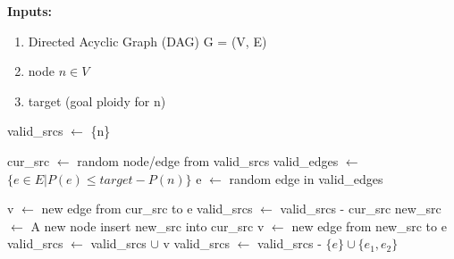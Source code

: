 \documentclass{article}
\begin{document}
\begin{algorithm}[H]
\caption{Reattach}\label{euclid}

\textbf{Inputs:} 
\begin{enumerate}
    \item Directed Acyclic Graph (DAG) G = (V, E)
    \item node $n \in V$
    \item target (goal ploidy for n)
\end{enumerate}

  \begin{algorithmic}[1]

    \State valid\_srcs $\gets$ \{n\}
    
        \State cur\_src $\gets$ random node/edge from valid\_srcs
        \State valid\_edges $\gets$ \( \{e \in E | P(e) \leq target - P(n)\}\)
        \State e $\gets$ random edge in valid\_edges
        
         
            \State v $\gets$ new edge from cur\_src to e
            \State valid\_srcs $\gets$ valid\_srcs - {cur\_src}
        \EndIf
         
            \State new\_src $\gets$ A new node 
            \State insert new\_src into cur\_src
            \State v $\gets$ new edge from new\_src to e
        \EndIf
        \State valid\_srcs $\gets$ valid\_srcs $\cup$ v
            \State valid\_srcs $\gets$ valid\_srcs - $\{e\} \cup \{e_1, e_2\}$ 
        \EndIf
        
    \EndWhile
        
    \EndProcedure
  \end{algorithmic}


\end{algorithm}


\end{document}
